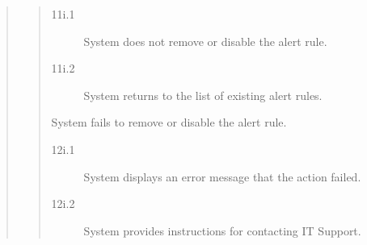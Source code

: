 \documentclass[]{article}
\begin{document}
\begin{enumerate}[{\bf BE3.}]
\begin{quote}
\begin{quote}
\begin{description}
\begin{description}
                            \item[\textmd{11i.1}] System does not remove or disable the alert rule.
                            \item[\textmd{11i.2}] System returns to the list of existing alert rules.
                        \end{description}
                        \item[\textmd{12i.}] System fails to remove or disable the alert rule.
                        \begin{description}
                            \item[\textmd{12i.1}] System displays an error message that the action failed.
                            \item[\textmd{12i.2}] System provides instructions for contacting IT Support.
                        \end{description}
                    \end{description}
                \end{quote}
        	\end{quote}
\end{enumerate}
\end{document}
